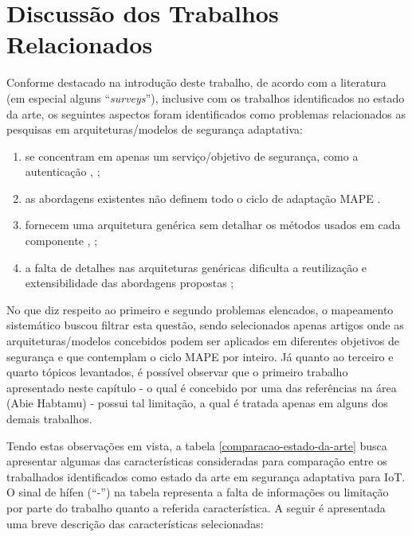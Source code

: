\documentclass[tid,table]{texufpel} %
\begin{document}

\section{Discussão dos Trabalhos Relacionados}

Conforme destacado na introdução deste trabalho, de acordo com a literatura (em especial alguns ``\textit{surveys}''), inclusive com os trabalhos identificados no estado da arte, os seguintes aspectos foram identificados como problemas relacionados as pesquisas em arquiteturas/modelos de segurança adaptativa:

\begin{enumerate}
\item  se concentram em apenas um serviço/objetivo de segurança, como a autenticação \cite{aman14}, \cite{elkhodary07};
\item as abordagens existentes não definem todo o ciclo de adaptação MAPE \cite{yuan12}.
\item fornecem uma arquitetura genérica sem detalhar os métodos usados em cada componente  \cite{aman14}, \cite{yuan12};
\item a falta de detalhes nas arquiteturas genéricas dificulta a reutilização e extensibilidade das abordagens propostas \cite{yuan12};
\end{enumerate}

No que diz respeito ao primeiro e segundo problemas elencados, o mapeamento sistemático buscou filtrar esta questão, sendo selecionados apenas artigos onde as arquiteturas/modelos concebidos podem ser aplicados em diferentes objetivos de segurança e que contemplam o ciclo MAPE por inteiro. Já quanto ao terceiro e quarto tópicos levantados, é possível observar que o primeiro trabalho apresentado neste capítulo \cite{habtamu12} - o qual é concebido por uma das referências na área (Abie Habtamu) - possui tal limitação, a qual é tratada apenas em alguns dos demais trabalhos.

Tendo estas observações em vista, a tabela \ref{comparacao-estado-da-arte} busca apresentar algumas das características consideradas para comparação entre os trabalhados identificados como estado da arte em segurança adaptativa para IoT. O sinal de hífen (``-'') na tabela representa a falta de informações ou limitação por parte do trabalho quanto a referida característica. A seguir é apresentada uma breve descrição das características selecionadas:
\end{document}
